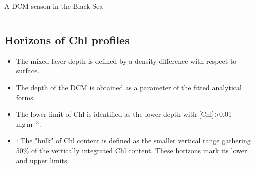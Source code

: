 \documentclass[final]{beamer}
\begin{document}
\begin{frame}[fragile]
\begin{columns}[T]
\begin{column}{.64\textwidth}
\begin{block}{ A DCM season in the Black Sea }
\begin{columns}[T]
\begin{column}{.20\textwidth}
        \subsection{Horizons of Chl profiles}
        \begin{itemize}[wide, labelwidth=!,labelindent=0pt]
          \item[\alert{MLD}] The mixed layer depth is defined by a  density difference with respect to surface.
          \item[\alert{DCM}] The depth of the DCM is obtained as a parameter of the fitted analytical forms.
          \item[\alert{low}] The lower limit of Chl is identified as the lower depth with [Chl]>0.01 $\mathrm{mg\,m^{-3}}$.
          \item[\alert{50,bottom/top}] : The "bulk" of Chl content is defined as the smaller vertical range gathering 50\% of the vertically integrated Chl content. These horizons mark its lower and upper limits. 
        \end{itemize}

	    \end{column}
	    

\end{columns}
\end{block}
\end{column}
\end{columns}
\end{frame}
\end{document}
